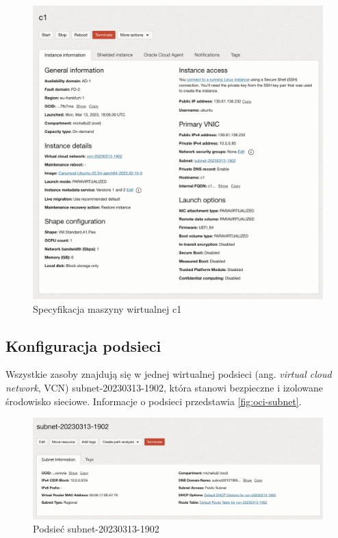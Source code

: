 \begin{figure}[H]
    \centering
    \includegraphics[width=\textwidth]{img/oci-instance-details}
    \caption{Specyfikacja maszyny wirtualnej c1}
    \label{fig:oci-instance-details}
\end{figure}

\subsection{Konfiguracja podsieci}

Wszystkie zasoby znajdują się w jednej wirtualnej podsieci (ang. \emph{virtual cloud network}, VCN) subnet-20230313-1902, która stanowi bezpieczne i izolowane środowisko sieciowe.
Informacje o podsieci przedstawia \autoref{fig:oci-subnet}.

\begin{figure}[H]
    \centering
    \includegraphics[width=\textwidth]{img/oci-subnet}
    \caption{Podsieć subnet-20230313-1902}
    \label{fig:oci-subnet}
\end{figure}

